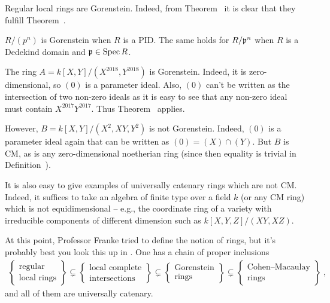 \documentclass[a4paper,parskip=half,numbers=enddot, DIV=12]{scrreprt}
\begin{document}
\begin{example*}
	\begin{alphanumerate}
		\item Regular local rings are Gorenstein. Indeed, from Theorem~ it is clear that they fulfill Theorem~.
		\item $R/(p^n)$ is Gorenstein when $R$ is a PID. The same holds for $R/\mathfrak{p}^n$ when $R$ is a Dedekind domain and $\mathfrak{p}\in\operatorname{Spec} R$.
		\item The ring $A=k[X,Y]/(X^{2018},Y^{2018})$ is Gorenstein. Indeed, it is zero-dimensional, so $(0)$ is a parameter ideal. Also, $(0)$ can't be written as the intersection of two non-zero ideals as it is easy to see that any non-zero ideal must contain $X^{2017}Y^{2017}$. Thus Theorem~ applies.
		
		However, $B=k[X,Y]/(X^2,XY,Y^2)$ is not Gorenstein. Indeed, $(0)$ is a parameter ideal again that can be written as $(0)=(X)\cap (Y)$. But $B$ is CM, as is any zero-dimensional noetherian ring (since then equality is trivial in Definition~).
		
		It is also easy to give examples of universally catenary rings which are not CM. Indeed, it suffices to take an algebra of finite type over a field $k$ (or any CM ring) which is not equidimensional -- e.g., the coordinate ring of a variety with irreducible components of different dimension such as $k[X,Y,Z]/(XY,XZ)$.
	\end{alphanumerate}
\end{example*}
At this point, Professor Franke tried to define the notion of  rings, but it's probably best you look this up in \cite[\S 21]{matsumuraCRT}. One has a chain of proper inclusions
\begin{align*}
	\left\{\begin{array}{c}
		\text{regular}\\
		\text{local rings}
	\end{array}\right\}\subsetneq 
	\left\{\begin{array}{c}
	\text{local complete}\\
	\text{intersections}
	\end{array}\right\}\subsetneq
	\left\{\begin{array}{c}
	\text{Gorenstein}\\
	\text{rings}
	\end{array}\right\}\subsetneq
	\left\{\begin{array}{c}
	\text{Cohen--Macaulay}\\
	\text{rings}
	\end{array}\right\}\;,
\end{align*}
and all of them are universally catenary.
\end{document}
